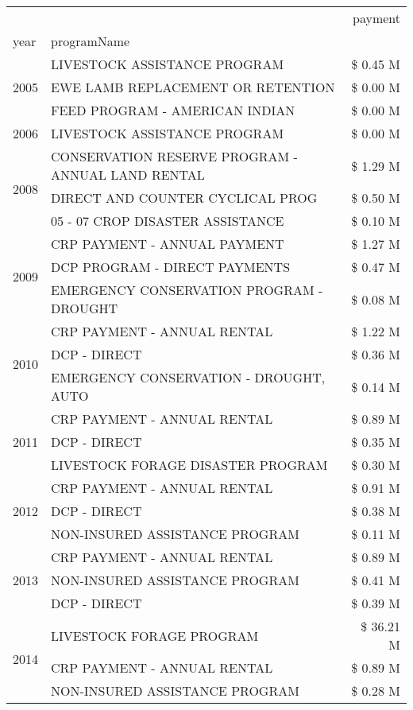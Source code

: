 \begin{tabular}{llr}
\toprule
 &  & payment \\
year & programName &  \\
\midrule
\multirow[t]{3}{*}{2005} & LIVESTOCK ASSISTANCE PROGRAM & \$ 0.45 M \\
 & EWE LAMB REPLACEMENT OR RETENTION & \$ 0.00 M \\
 & FEED PROGRAM - AMERICAN INDIAN & \$ 0.00 M \\
\cline{1-3}
2006 & LIVESTOCK ASSISTANCE PROGRAM & \$ 0.00 M \\
\cline{1-3}
\multirow[t]{3}{*}{2008} & CONSERVATION RESERVE PROGRAM - ANNUAL LAND RENTAL & \$ 1.29 M \\
 & DIRECT AND COUNTER CYCLICAL PROG & \$ 0.50 M \\
 & 05 - 07 CROP DISASTER ASSISTANCE & \$ 0.10 M \\
\cline{1-3}
\multirow[t]{3}{*}{2009} & CRP PAYMENT - ANNUAL PAYMENT & \$ 1.27 M \\
 & DCP PROGRAM - DIRECT PAYMENTS & \$ 0.47 M \\
 & EMERGENCY CONSERVATION PROGRAM - DROUGHT & \$ 0.08 M \\
\cline{1-3}
\multirow[t]{3}{*}{2010} & CRP PAYMENT - ANNUAL RENTAL & \$ 1.22 M \\
 & DCP - DIRECT & \$ 0.36 M \\
 & EMERGENCY CONSERVATION - DROUGHT, AUTO & \$ 0.14 M \\
\cline{1-3}
\multirow[t]{3}{*}{2011} & CRP PAYMENT - ANNUAL RENTAL & \$ 0.89 M \\
 & DCP - DIRECT & \$ 0.35 M \\
 & LIVESTOCK FORAGE DISASTER PROGRAM & \$ 0.30 M \\
\cline{1-3}
\multirow[t]{3}{*}{2012} & CRP PAYMENT - ANNUAL RENTAL & \$ 0.91 M \\
 & DCP - DIRECT & \$ 0.38 M \\
 & NON-INSURED ASSISTANCE PROGRAM & \$ 0.11 M \\
\cline{1-3}
\multirow[t]{3}{*}{2013} & CRP PAYMENT - ANNUAL RENTAL & \$ 0.89 M \\
 & NON-INSURED ASSISTANCE PROGRAM & \$ 0.41 M \\
 & DCP - DIRECT & \$ 0.39 M \\
\cline{1-3}
\multirow[t]{3}{*}{2014} & LIVESTOCK FORAGE PROGRAM & \$ 36.21 M \\
 & CRP PAYMENT - ANNUAL RENTAL & \$ 0.89 M \\
 & NON-INSURED ASSISTANCE PROGRAM & \$ 0.28 M \\

\end{tabular}
